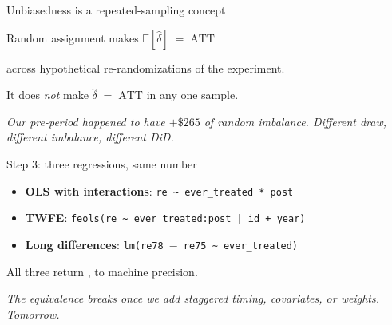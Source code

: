 \documentclass[11pt,aspectratio=169]{beamer}
\begin{document}
\begin{frame}{Unbiasedness is a repeated-sampling concept}
\vspace{1em}
\begin{center}
\large
Random assignment makes \;$\mathbb{E}[\widehat\delta] \;=\; \text{ATT}$
\end{center}
\vspace{0.6em}
\begin{center}
\large
across hypothetical re-randomizations of the experiment.
\end{center}
\vspace{1em}
\begin{center}
\large
It does \textit{not} make \;$\widehat\delta \;=\; \text{ATT}$ \;in any one sample.
\end{center}
\vspace{0.6em}
\begin{center}
\small\color{warmgray}\itshape
Our pre-period happened to have $+\$265$ of random imbalance. \;Different draw, different imbalance, different DiD.
\end{center}
\end{frame}

\begin{frame}{Step 3: three regressions, same number}
\vspace{0.6em}
\begin{itemize}
  \item \textbf{OLS with interactions}: \;\texttt{re \textasciitilde\ ever\_treated * post}
  \item \textbf{TWFE}: \;\texttt{feols(re \textasciitilde\ ever\_treated:post | id + year)}
  \item \textbf{Long differences}: \;\texttt{lm(re78 $-$ re75 \textasciitilde\ ever\_treated)}
\end{itemize}
\vspace{0.6em}
\begin{center}
\large
All three return \;, to machine precision.
\end{center}
\vspace{0.6em}
\begin{center}
\small\color{warmgray}\itshape
The equivalence breaks once we add staggered timing, covariates, or weights. \;Tomorrow.
\end{center}
\end{frame}
\end{document}
